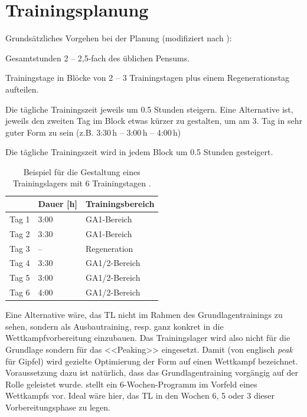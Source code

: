 \documentclass[a4paper,DIV13,BCOR0cm]{scrartcl}
\begin{document}
\section{Trainingsplanung}

Grundsätzliches Vorgehen bei der Planung (modifiziert nach ):

\begin{itemize*}
        \item Gesamtstunden 2 -- 2,5-fach des üblichen Pensums.
        \item Trainingstage in Blöcke von 2 -- 3 Trainingstagen plus einem Regenerationstag aufteilen.
        \item Die tägliche Trainingszeit jeweils um 0.5 Stunden steigern.
                Eine Alternative ist, jeweils den zweiten Tag im Block etwas kürzer zu gestalten,
                um am 3. Tag in sehr guter Form zu sein (z.B. 3:30\,h -- 3:00\,h -- 4:00\,h)
        \item Die tägliche Trainingszeit wird in jedem Block um 0.5 Stunden gesteigert.
\end{itemize*}

\begin{table}
        \centering
\begin{tabular}{lll}
    \toprule
    & Dauer [h] & Trainingsbereich \\
    \midrule
        Tag 1 & 3:00 & GA1-Bereich \\
        Tag 2 & 3:30 & GA1-Bereich \\
        Tag 3 & -- & Regeneration \\
        Tag 4 & 3:30 & GA1/2-Bereich \\
        Tag 5 & 3:00 & GA1/2-Bereich \\
        Tag 6 & 4:00 & GA1/2-Bereich \\
    \bottomrule
\end{tabular}
\caption{Beispiel für die Gestaltung eines Trainingslagers mit 6 Trainingstagen \protect\cite{Beck2015}.}
        \label{tab:beispielplan}
\end{table}

Eine Alternative wäre, das TL nicht im Rahmen des Grundlagentrainings zu sehen,
sondern als Ausbautraining, resp. ganz konkret in die Wettkampfvorbereitung einzubauen.
Das Trainingslager wird also nicht für die Grundlage sondern für das <<Peaking>> eingesetzt.
Damit (von englisch \textit{peak} für Gipfel) wird gezielte Optimierung der Form auf einen Wettkampf bezeichnet.
Voraussetzung dazu ist natürlich, dass das Grundlagentraining vorgängig auf der Rolle geleistet wurde.
 stellt ein 6-Wochen-Programm im Vorfeld eines Wettkampfs vor.
Ideal wäre hier, das TL in den Wochen 6, 5 oder 3 dieser Vorbereitungsphase zu legen.
\end{document}
